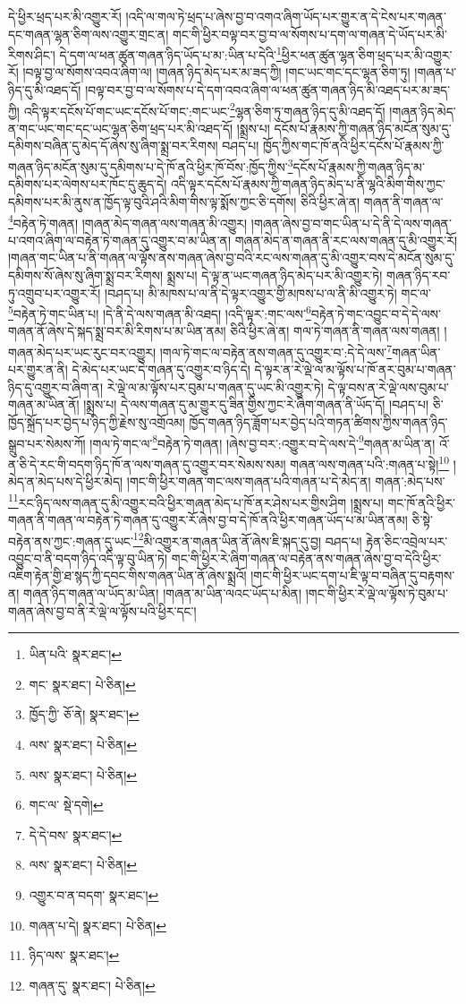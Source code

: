 དེ་ཕྱིར་ཕྲད་པར་མི་འགྱུར་རོ། །འདི་ལ་གལ་ཏེ་ཕྲད་པ་ཞེས་བྱ་བ་འགའ་ཞིག་ཡོད་པར་གྱུར་ན་དེ་ངེས་པར་གཞན་དང་གཞན་ལྷན་ཅིག་ལས་འགྱུར་གྲང་ན། གང་གི་ཕྱིར་བལྟ་བར་བྱ་བ་ལ་སོགས་པ་དག་ལ་གཞན་དེ་ཡོད་པར་མི་རིགས་ཤིང་། དེ་དག་ལ་ཕན་ཚུན་གཞན་ཉིད་ཡོད་པ་མ་:ཡིན་པ་དེའི་\footnote{ཡིན་པའི་  སྣར་ཐང་། }ཕྱིར་ཕན་ཚུན་ལྷན་ཅིག་ཕྲད་པར་མི་འགྱུར་རོ། །བལྟ་བྱ་ལ་སོགས་འབའ་ཞིག་ལ། །གཞན་ཉིད་མེད་པར་མ་ཟད་ཀྱི། །གང་ཡང་གང་དང་ལྷན་ཅིག་ཏུ། །གཞན་པ་ཉིད་དུ་མི་འཐད་དོ། །བལྟ་བར་བྱ་བ་ལ་སོགས་པ་དེ་དག་འབའ་ཞིག་ལ་ཕན་ཚུན་གཞན་ཉིད་མི་འཐད་པར་མ་ཟད་ཀྱི། འདི་ལྟར་དངོས་པོ་གང་ཡང་དངོས་པོ་གང་:གང་ཡང་\footnote{གང་  སྣར་ཐང་།  པེ་ཅིན། }ལྷན་ཅིག་ཏུ་གཞན་ཉིད་དུ་མི་འཐད་དོ། །གཞན་ཉིད་མེད་ན་གང་ཡང་གང་དང་ཡང་ལྷན་ཅིག་ཕྲད་པར་མི་འཐད་དོ། །སྨྲས་པ། དངོས་པོ་རྣམས་ཀྱི་གཞན་ཉིད་མངོན་སུམ་དུ་དམིགས་བཞིན་དུ་མེད་དོ་ཞེས་སུ་ཞིག་སྨྲ་བར་རིགས། བཤད་པ། ཁྱོད་ཀྱིས་གང་ཁོ་ནའི་ཕྱིར་དངོས་པོ་རྣམས་ཀྱི་གཞན་ཉིད་མངོན་སུམ་དུ་དམིགས་པ་དེ་ཁོ་ནའི་ཕྱིར་ཁོ་བོས་:ཁྱོད་ཀྱིས་\footnote{ཁྱོད་ཀྱི་  ཅོ་ནེ།  སྣར་ཐང་། }དངོས་པོ་རྣམས་ཀྱི་གཞན་ཉིད་མ་དམིགས་པར་ལེགས་པར་ཁོང་དུ་ཆུད་དེ། འདི་ལྟར་དངོས་པོ་རྣམས་ཀྱི་གཞན་ཉིད་མེད་པ་ནི་ལྷའི་མིག་གིས་ཀྱང་དམིགས་པར་མི་ནུས་ན་ཁྱོད་ལྟ་བུའི་ཤའི་མིག་གིས་ལྟ་སྨོས་ཀྱང་ཅི་དགོས། ཅིའི་ཕྱིར་ཞེ་ན། གཞན་ནི་གཞན་ལ་\footnote{ལས་  སྣར་ཐང་།  པེ་ཅིན། }བརྟེན་ཏེ་གཞན། །གཞན་མེད་གཞན་ལས་གཞན་མི་འགྱུར། །གཞན་ཞེས་བྱ་བ་གང་ཡིན་པ་དེ་ནི་དེ་ལས་གཞན་པ་འགའ་ཞིག་ལ་བརྟེན་ཏེ་གཞན་དུ་འགྱུར་བ་མ་ཡིན་ན། གཞན་མེད་ན་གཞན་ནི་རང་ལས་གཞན་དུ་མི་འགྱུར་རོ། །གཞན་གང་ཡིན་པ་ནི་གཞན་ལ་ལྟོས་ནས་གཞན་ཞེས་བྱ་བའི་རང་ལས་གཞན་དུ་མི་འགྱུར་བས་དེ་མངོན་སུམ་དུ་དམིགས་སོ་ཞེས་སུ་ཞིག་སྨྲ་བར་རིགས། སྨྲས་པ། དེ་ལྟ་ན་ཡང་གཞན་ཉིད་མེད་པར་མི་འགྱུར་ཏེ། གཞན་ཉིད་རབ་ཏུ་འགྲུབ་པར་འགྱུར་རོ། །བཤད་པ། མི་མཁས་པ་ལ་ནི་དེ་ལྟར་འགྱུར་གྱི་མཁས་པ་ལ་ནི་མི་འགྱུར་ཏེ། གང་ལ་\footnote{ལས་  སྣར་ཐང་།  པེ་ཅིན། }བརྟེན་ཏེ་གང་ཡིན་པ། །དེ་ནི་དེ་ལས་གཞན་མི་འཐད། །འདི་ལྟར་:གང་ལས་\footnote{གང་ལ་  སྡེ་དགེ། }བརྟེན་ཏེ་གང་འབྱུང་བ་དེ་དེ་ལས་གཞན་ནོ་ཞེས་དེ་སྐད་སྨྲ་བར་མི་རིགས་པ་མ་ཡིན་ནམ། ཅིའི་ཕྱིར་ཞེ་ན། གལ་ཏེ་གཞན་ནི་གཞན་ལས་གཞན། །གཞན་མེད་པར་ཡང་རུང་བར་འགྱུར། །གལ་ཏེ་གང་ལ་བརྟེན་ནས་གཞན་དུ་འགྱུར་བ་:དེ་དེ་ལས་\footnote{དེ་དེ་བས་  སྣར་ཐང་། }གཞན་ཡིན་པར་གྱུར་ན་ནི། དེ་མེད་པར་ཡང་དེ་གཞན་དུ་འགྱུར་བ་ཉིད་དེ། དེ་ལྟར་ན་རེ་ལྡེ་ལ་མ་ལྟོས་པ་ཁོ་ནར་བུམ་པ་གཞན་ཉིད་དུ་འགྱུར་བ་ཞིག་ན། རེ་ལྡེ་ལ་མ་ལྟོས་པར་བུམ་པ་གཞན་དུ་ཡང་མི་འགྱུར་ཏེ། དེ་ལྟ་བས་ན་རེ་ལྡེ་ལས་བུམ་པ་གཞན་མ་ཡིན་ནོ། །སྨྲས་པ། དེ་ལས་གཞན་དུ་མ་གྱུར་དུ་ཟིན་གྱིས་ཀྱང་རེ་ཞིག་གཞན་ནི་ཡོད་དོ། །བཤད་པ། ཅི་ཁྱོད་སྐྲོད་པར་བྱེད་པ་ཉིད་ཀྱི་རྗེས་སུ་འགྲོའམ། ཁྱོད་གཞན་ཉིད་ཟློག་པར་བྱེད་པའི་གཏན་ཚིགས་ཀྱིས་གཞན་ཉིད་སྒྲུབ་པར་སེམས་ཀོ། །གལ་ཏེ་གང་ལ་\footnote{ལས་  སྣར་ཐང་།  པེ་ཅིན། }བརྟེན་ཏེ་གཞན། །ཞེས་བྱ་བར་:འགྱུར་བ་དེ་ལས་དེ་\footnote{འགྱུར་བ་ན་བདག་  སྣར་ཐང་། }གཞན་མ་ཡིན་ན། འོ་ན་ཅི་དེ་རང་གི་བདག་ཉིད་ཁོ་ན་ལས་གཞན་དུ་འགྱུར་བར་སེམས་སམ། གཞན་ལས་གཞན་པའི་:གཞན་པ་སྟེ།\footnote{གཞན་པ་དེ།  སྣར་ཐང་།  པེ་ཅིན། } །མེད་ན་མེད་པས་དེ་ཕྱིར་མེད། །གང་གི་ཕྱིར་གཞན་གང་ལས་གཞན་པའི་གཞན་པ་དེ་མེད་ན། གཞན་:མེད་པས་\footnote{ཉིད་ལས་  སྣར་ཐང་། }རང་ཉིད་ལས་གཞན་དུ་མི་འགྱུར་བའི་ཕྱིར་གཞན་མེད་པ་ཁོ་ནར་ཤེས་པར་གྱིས་ཤིག །སྨྲས་པ། གང་ཁོ་ནའི་ཕྱིར་གཞན་ནི་གཞན་ལ་བརྟེན་ཏེ་གཞན་དུ་འགྱུར་རོ་ཞེས་བྱ་བ་དེ་ཁོ་ནའི་ཕྱིར་གཞན་ཡོད་པ་མ་ཡིན་ནམ། ཅི་སྟེ་བརྟེན་ནས་ཀྱང་:གཞན་དུ་ཡང་\footnote{གཞན་དུ་  སྣར་ཐང་།  པེ་ཅིན། }མི་འགྱུར་ན་གཞན་ཡིན་ནོ་ཞེས་ཇི་སྐད་དུ་བྱ། བཤད་པ། རྟེན་ཅིང་འབྲེལ་པར་འབྱུང་བ་ནི་བདག་ཉིད་འདི་ལྟ་བུ་ཡིན་ཏེ། གང་གི་ཕྱིར་རེ་ཞིག་གཞན་ལ་བརྟེན་ནས་གཞན་ཞེས་བྱ་བ་དེའི་ཕྱིར་འཇིག་རྟེན་གྱི་ཐ་སྙད་ཀྱི་དབང་གིས་གཞན་ཡིན་ནོ་ཞེས་སྨྲའོ། །གང་གི་ཕྱིར་ཡང་དག་པ་ཇི་ལྟ་བ་བཞིན་དུ་བརྟགས་ན། གཞན་ཉིད་གཞན་ལ་ཡོད་མ་ཡིན། །གཞན་མ་ཡིན་ལའང་ཡོད་པ་མིན། །གང་གི་ཕྱིར་རེ་ལྡེ་ལ་ལྟོས་ཏེ་བུམ་པ་གཞན་ཞེས་བྱ་བ་ནི་རེ་ལྡེ་ལ་ལྟོས་པའི་ཕྱིར་དང་། 